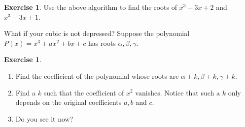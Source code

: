 \documentclass[reqno, 12pt, letter]{article}
\theoremstyle{plain}
\theoremstyle{definition}
\newtheorem{exercise}[theorem]{Exercise}
\theoremstyle{remark}
\numberwithin{equation}{section}
\begin{document}
	\begin{exercise}
		Use the above algorithm to find the roots of $x^3 - 3x + 2$ and $x^3 - 3x + 1$.
	\end{exercise}
	
	What if your cubic is not depressed? Suppose the polynomial $ P(x) = x^3 + ax^2 + bx + c$ has roots $\alpha,\beta,\gamma$. 
	\begin{exercise} $ $
		\begin{enumerate}
			\item Find the coefficient of the polynomial whose roots are $\alpha+ k, \beta + k, \gamma + k$.
			\item Find a $ k$ such that the coefficient of $ x^2$ vanishes. Notice that such a $ k$ only depends on the original coefficients $ a,b$ and $c$. 
			\item Do you see it now? 
		\end{enumerate}
	\end{exercise}
	
\end{document}
